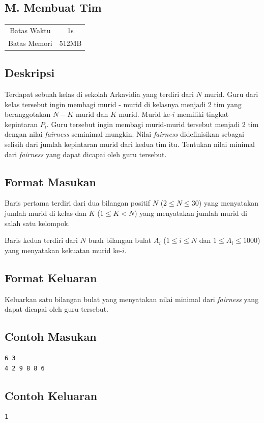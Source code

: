 \documentclass{article}
\begin{document}
\begin{center}
    \section*{M. Membuat Tim} %

    \begin{tabular}{ | c c | }
        \hline
        Batas Waktu  & 1s \\    %
        Batas Memori & 512MB \\  %
        \hline
    \end{tabular}
\end{center}

\subsection*{Deskripsi}
Terdapat sebuah kelas di sekolah Arkavidia yang terdiri dari $N$ murid. Guru dari kelas tersebut ingin membagi murid - murid di kelasnya menjadi 2 tim yang beranggotakan $N - K$ murid dan $K$ murid. Murid ke-$i$ memiliki tingkat kepintaran $P_i$. Guru tersebut ingin membagi murid-murid tersebut menjadi 2 tim dengan nilai \textit{fairness} seminimal mungkin. Nilai \textit{fairness} didefinisikan sebagai selisih dari jumlah kepintaran murid dari kedua tim itu. Tentukan nilai minimal dari \textit{fairness} yang dapat dicapai oleh guru tersebut.

\subsection*{Format Masukan}
Baris pertama terdiri dari dua bilangan positif $N$ ($2 \leq N \leq 30$) yang menyatakan jumlah murid di kelas dan $K$ ($1 \leq K < N$) yang menyatakan jumlah murid di salah satu kelompok.

Baris kedua terdiri dari $N$ buah bilangan bulat $A_i$ ($ 1 \leq i \leq N$ dan $1 \leq A_i \leq 1000$) yang menyatakan kekuatan murid ke-$i$.

\subsection*{Format Keluaran}
Keluarkan satu bilangan bulat yang menyatakan nilai minimal dari \textit{fairness} yang dapat dicapai oleh guru tersebut.

\begin{multicols}{2}
\subsection*{Contoh Masukan}
\begin{lstlisting}
6 3
4 2 9 8 8 6 
\end{lstlisting}
\columnbreak

\subsection*{Contoh Keluaran}
\begin{lstlisting}
1
\end{lstlisting}
\vfill
\null
\end{multicols}
\end{document}
